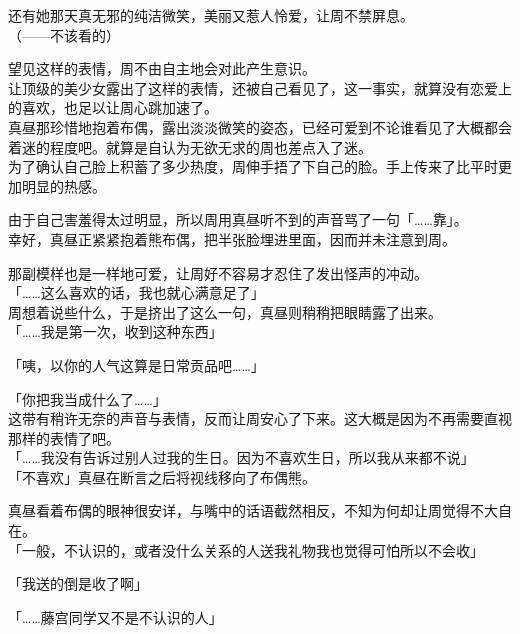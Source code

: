 还有她那天真无邪的纯洁微笑，美丽又惹人怜爱，让周不禁屏息。\\

（——不该看的）

望见这样的表情，周不由自主地会对此产生意识。\\

让顶级的美少女露出了这样的表情，还被自己看见了，这一事实，就算没有恋爱上的喜欢，也足以让周心跳加速了。\\

真昼那珍惜地抱着布偶，露出淡淡微笑的姿态，已经可爱到不论谁看见了大概都会着迷的程度吧。就算是自认为无欲无求的周也差点入了迷。\\

为了确认自己脸上积蓄了多少热度，周伸手捂了下自己的脸。手上传来了比平时更加明显的热感。

由于自己害羞得太过明显，所以周用真昼听不到的声音骂了一句「……靠」。\\

幸好，真昼正紧紧抱着熊布偶，把半张脸埋进里面，因而并未注意到周。

那副模样也是一样地可爱，让周好不容易才忍住了发出怪声的冲动。\\

「……这么喜欢的话，我也就心满意足了」\\

周想着说些什么，于是挤出了这么一句，真昼则稍稍把眼睛露了出来。\\

「……我是第一次，收到这种东西」

「咦，以你的人气这算是日常贡品吧……」

「你把我当成什么了……」\\

这带有稍许无奈的声音与表情，反而让周安心了下来。这大概是因为不再需要直视那样的表情了吧。\\

「……我没有告诉过别人过我的生日。因为不喜欢生日，所以我从来都不说」\\

「不喜欢」真昼在断言之后将视线移向了布偶熊。

真昼看着布偶的眼神很安详，与嘴中的话语截然相反，不知为何却让周觉得不大自在。\\

「一般，不认识的，或者没什么关系的人送我礼物我也觉得可怕所以不会收」

「我送的倒是收了啊」

「……藤宫同学又不是不认识的人」\\

